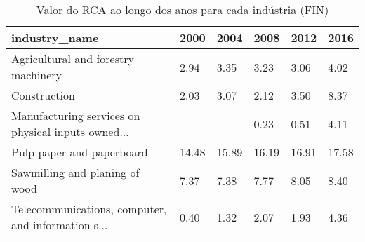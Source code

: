 \begin{table}
\centering
\caption{Valor do RCA ao longo dos anos para cada indústria (FIN)}
\begin{tabular}{p{6cm}p{1.5cm}p{1.5cm}p{1.5cm}p{1.5cm}p{1.5cm}}
\toprule
                                     industry\_name &  2000 &  2004 &  2008 &  2012 &  2016 \\
\midrule
               Agricultural and forestry machinery &  2.94 &  3.35 &  3.23 &  3.06 &  4.02 \\
                                      Construction &  2.03 &  3.07 &  2.12 &  3.50 &  8.37 \\
Manufacturing services on physical inputs owned... &     - &     - &  0.23 &  0.51 &  4.11 \\
                         Pulp paper and paperboard & 14.48 & 15.89 & 16.19 & 16.91 & 17.58 \\
                    Sawmilling and planing of wood &  7.37 &  7.38 &  7.77 &  8.05 &  8.40 \\
Telecommunications, computer, and information s... &  0.40 &  1.32 &  2.07 &  1.93 &  4.36 \\
\bottomrule
\end{tabular}
\end{table}
